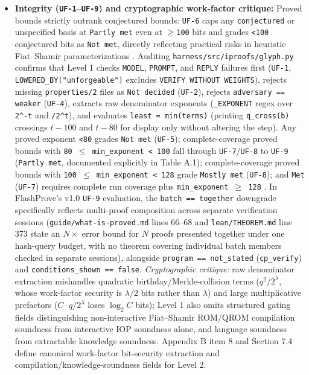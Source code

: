 \documentclass[11pt,letterpaper]{article}
\begin{document}
\begin{itemize}
\item \textbf{Integrity (\texttt{UF-1}--\texttt{UF-9}) and cryptographic work-factor critique:} Proved bounds strictly outrank conjectured bounds: \texttt{UF-6} caps any \texttt{conjectured} or unspecified basis at \texttt{Partly met} even at \texttt{$\ge$100} bits and grades \texttt{<100} conjectured bits as \texttt{Not met}, directly reflecting practical risks in heuristic Fiat--Shamir parameterizations \cite{iproofs2026}. Auditing \texttt{harness/\allowbreak{}src/\allowbreak{}iproofs/\allowbreak{}glyph.\allowbreak{}py} confirms that Level 1 checks \texttt{MODEL}, \texttt{PROMPT}, and \texttt{REPLY} failures first (\texttt{UF-1}, \texttt{LOWERED\_\allowbreak{}BY["unforgeable"]} excludes \texttt{VERIFY WITHOUT WEIGHTS}), rejects missing \texttt{properties/\allowbreak{}2} files as \texttt{Not decided} (\texttt{UF-2}), rejects \texttt{adversary == weaker} (\texttt{UF-4}), extracts raw denominator exponents (\texttt{\_\allowbreak{}EXPONENT} regex over \texttt{2\textasciicircum{}-\allowbreak{}t} and \texttt{/\allowbreak{}2\textasciicircum{}t}), and evaluates \texttt{least = min(terms)} (printing \texttt{q\_\allowbreak{}cross(b)} crossings $t - 100$ and $t - 80$ for display only without altering the step). Any proved exponent \texttt{<80} grades \texttt{Not met} (\texttt{UF-5}); complete-coverage proved bounds with \texttt{80 $\le$ min\_\allowbreak{}exponent < 100} fall through \texttt{UF-7}/\texttt{UF-8} to \texttt{UF-9} (\texttt{Partly met}, documented explicitly in Table A.1); complete-coverage proved bounds with \texttt{100 $\le$ min\_\allowbreak{}exponent < 128} grade \texttt{Mostly met} (\texttt{UF-8}); and \texttt{Met} (\texttt{UF-7}) requires complete run coverage plus \texttt{min\_\allowbreak{}exponent $\ge$ 128} \cite{iproofs2026}. In FlashProve's v1.0 \texttt{UF-9} evaluation, the \texttt{batch == together} downgrade specifically reflects multi-proof composition across separate verification sessions (\texttt{guide/\allowbreak{}what-\allowbreak{}is-\allowbreak{}proved.\allowbreak{}md} lines 66--68 and \texttt{lean/\allowbreak{}THEOREM.\allowbreak{}md} line 373 state an $N\times$ error bound for $N$ proofs presented together under one hash-query budget, with no theorem covering individual batch members checked in separate sessions), alongside \texttt{program == not\_\allowbreak{}stated} (\texttt{cp\_\allowbreak{}verify}) and \texttt{conditions\_\allowbreak{}shown == false}. \textit{Cryptographic critique:} raw denominator extraction mishandles quadratic birthday/Merkle-collision terms ($q^2/2^\lambda$, whose work-factor security is $\lambda/2$ bits rather than $\lambda$) and large multiplicative prefactors ($C \cdot q/2^\lambda$ loses $\log_2 C$ bits); Level 1 also omits structured gating fields distinguishing non-interactive Fiat--Shamir ROM/QROM compilation soundness from interactive IOP soundness alone, and language soundness from extractable knowledge soundness. Appendix B item 8 and Section 7.4 define canonical work-factor bit-security extraction and compilation/knowledge-soundness fields for Level 2.

\end{itemize}
\end{document}
